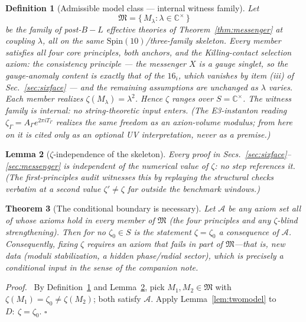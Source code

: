 \documentclass[
  aps,
  prd,
  preprint,
  nofootinbib,
  superscriptaddress,
  longbibliography
]{revtex4-2}
\newcommand{\Spin}{\mathrm{Spin}}
\newtheorem{theorem}{Theorem}[section]
\newtheorem{lemma}[theorem]{Lemma}
\newtheorem{definition}[theorem]{Definition}
\newenvironment{proof}{\par\noindent\textit{Proof.}\ }{\hfill\(\square\)\par}
\begin{document}
\begin{definition}[Admissible model class --- internal witness family]
\label{def:class}
Let
\[
  \mathfrak M=\{\,M_\lambda:\lambda\in\mathbb C^\times\,\}
\]
be the family of post-\(B\!-\!L\) effective theories of
Theorem~\ref{thm:messenger} at coupling \(\lambda\), all on the same
\(\Spin(10)\)/three-family skeleton.  Every member satisfies all four core
principles, both anchors, and the Killing-contact selection axiom: the
consistency principle --- the messenger \(X\) is a gauge singlet, so the
gauge-anomaly content is exactly that of the \(16_i\), which vanishes by
item (iii) of Sec.~\ref{sec:sixface} --- and the remaining assumptions are
unchanged as \(\lambda\) varies.  Each member realizes
\(\zeta(M_\lambda)=\lambda^2\).
Hence \(\zeta\) ranges over \(S=\mathbb C^\times\).  The witness family is
internal: no string-theoretic input enters.  (The E3-instanton reading
\(\zeta_\Gamma=A_\Gamma e^{2\pi iT_\Gamma}\)
\cite{Witten1996,KatzVafa1996,BeasleyHeckmanVafa2008I} realizes the same
freedom as an axion-volume modulus; from here on it is cited only as an
optional UV interpretation, never as a premise.)
\end{definition}

\begin{lemma}[\(\zeta\)-independence of the skeleton]
\label{lem:zetaindep}
Every proof in Secs.~\ref{sec:sixface}--\ref{sec:messenger} is independent
of the numerical value of \(\zeta\): no step references it.  (The
first-principles audit witnesses this by replaying the structural checks
verbatim at a second value \(\zeta'\ne\zeta\) far outside the benchmark
windows.)
\end{lemma}

\begin{theorem}[The conditional boundary is necessary]
\label{thm:boundary}
Let \(\mathcal A\) be any axiom set all of whose axioms hold in every
member of \(\mathfrak M\) (the four principles and any \(\zeta\)-blind
strengthening).  Then for no \(\zeta_0\in S\) is the statement
\(\zeta=\zeta_0\) a consequence of \(\mathcal A\).  Consequently, fixing
\(\zeta\) requires an axiom that fails in part of \(\mathfrak M\)---that
is, new data (moduli stabilization, a hidden phase/radial sector), which is
precisely a conditional input in the sense of the companion note.
\end{theorem}

\begin{proof}
By Definition~\ref{def:class} and Lemma~\ref{lem:zetaindep}, pick
\(M_1,M_2\in\mathfrak M\) with \(\zeta(M_1)=\zeta_0\ne\zeta(M_2)\); both
satisfy \(\mathcal A\).  Apply Lemma~\ref{lem:twomodel} to
\(D:\ \zeta=\zeta_0\).
\end{proof}
\end{document}
